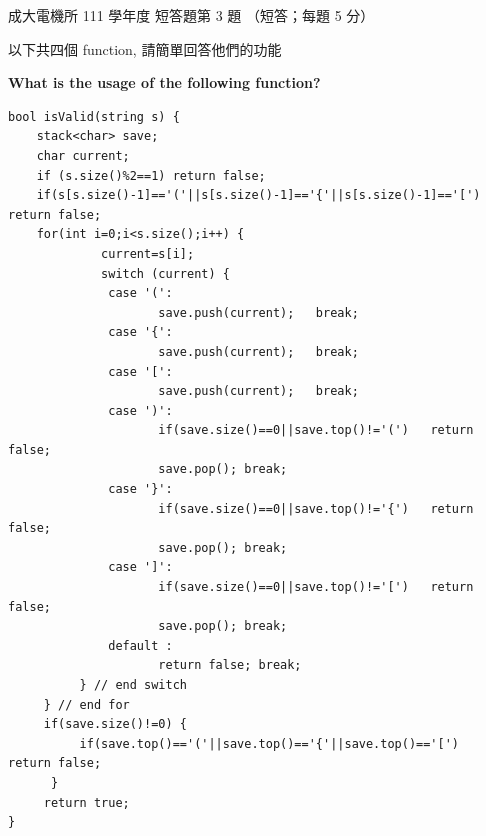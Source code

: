 \begin{pastexam}[label={px:ncku-111-ee-ds-23}]{成大電機所 111 學年度 短答題第 3 題}
（短答；每題 5 分）

以下共四個 function, 請簡單回答他們的功能

\textbf{What is the usage of the following function?}
\begin{verbatim}
bool isValid(string s) {
    stack<char> save;
    char current;
    if (s.size()%2==1) return false;
    if(s[s.size()-1]=='('||s[s.size()-1]=='{'||s[s.size()-1]=='[')   return false;
    for(int i=0;i<s.size();i++) {
             current=s[i];
             switch (current) {
              case '(':
                     save.push(current);   break;
              case '{':
                     save.push(current);   break;
              case '[':
                     save.push(current);   break;
              case ')':
                     if(save.size()==0||save.top()!='(')   return false;
                     save.pop(); break;
              case '}':
                     if(save.size()==0||save.top()!='{')   return false;
                     save.pop(); break;
              case ']':
                     if(save.size()==0||save.top()!='[')   return false;
                     save.pop(); break;
              default :
                     return false; break;
          } // end switch
     } // end for
     if(save.size()!=0) {
          if(save.top()=='('||save.top()=='{'||save.top()=='[')   return false;
      }
     return true;
}
\end{verbatim}
\end{pastexam}

